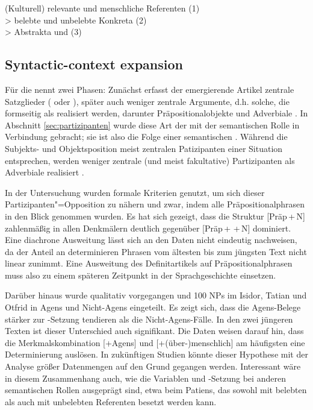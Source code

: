 \begin{exe}
	\ex \label{ex:belebtheitsskala} (Kulturell) relevante  und menschliche Referenten (1)\\>  belebte  und unbelebte  Konkreta (2)\\> Abstrakta  und  (3)
	\end{exe}


\subsection{Syntactic-context expansion} \label{sec:syn-expansion}

Für die  nennt \textcite{Himmelmann2004} zwei Phasen: Zunächst erfasst der emergierende Artikel zentrale Satzglieder ( oder ), später auch weniger zentrale Argumente, d.h. solche, die formseitig als  realisiert werden, darunter Präpositionalobjekte  und Adverbiale  \parencite{Himmelmann1998}. In Abschnitt \ref{sec:partizipanten} wurde diese Art der  mit der semantischen Rolle  in Verbindung gebracht; sie ist also  die Folge einer semantischen . Während die  Subjekts- und Objektsposition  meist zentralen Patizipanten einer Situation entsprechen, werden weniger zentrale (und meist fakultative) Partizipanten als Adverbiale  realisiert \parencite{Lehmann2004a}. 

In der Untersuchung wurden formale Kriterien genutzt, um sich dieser Partizipanten"=Opposition zu nähern und zwar, indem alle Präpositionalphrasen  in den Blick genommen wurden. Es hat sich gezeigt, dass die Struktur [Präp\,+\,N] zahlenmäßig in allen Denkmälern deutlich gegenüber [Präp\,+\,\,+\,N] dominiert. Eine diachrone Ausweitung lässt sich an den Daten nicht eindeutig nachweisen, da der Anteil an determinieren Phrasen vom ältesten bis zum jüngsten Text nicht linear zunimmt. Eine Ausweitung des Definitartikels  auf Präpositionalphrasen  muss also zu einem späteren Zeitpunkt in der Sprachgeschichte einsetzen. 

Darüber hinaus wurde qualitativ vorgegangen und 100 NPs im Isidor, Tatian und Otfrid in Agens und Nicht-Agens  eingeteilt. Es zeigt sich, dass die Agens-Belege  stärker zur -Setzung tendieren als die Nicht-Agens-Fälle. In den zwei jüngeren Texten ist dieser Unterschied auch signifikant. Die Daten weisen darauf hin, dass die Merkmalskombination [+Agens]  und [+(über-)menschlich] am häufigsten eine Determinierung auslösen. In zukünftigen Studien könnte dieser Hypothese mit der Analyse größer Datenmengen auf den Grund gegangen werden. Interessant wäre in diesem Zusammenhang auch, wie die Variablen  und -Setzung bei anderen semantischen Rollen  ausgeprägt sind, etwa beim Patiens, das sowohl mit belebten als auch mit unbelebten Referenten besetzt werden kann.   

